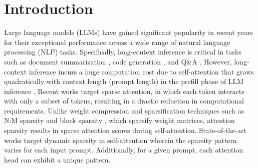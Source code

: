 \documentclass[conference]{IEEEtran}
\begin{document}
%
\IEEEpeerreviewmaketitle
\section{Introduction}
Large language models (LLMs) have gained significant popularity in recent years for their exceptional performance across a wide range of natural language processing (NLP) tasks. Specifically, long-context inference is critical in tasks such as document summarization \cite{liao2025e2llm, bai2025longbench}, code generation \cite{huynh2025large, yang2025empirical}, and Q\&A \cite{yan2025mir,xiao2025generalizing}. However, long-context inference incurs a huge computation cost due to self-attention that grows quadratically with context length (prompt length) in the prefill phase of LLM inference \cite{vaswani2017attention}. Recent works \cite{NEURIPS2020_c8512d14, NEURIPS2024_5dfbe6f5, xiao2024efficient,hao2025omnikv,flexprefill} target sparse attention, in which each token interacts with only a subset of tokens, resulting in a drastic reduction in computational requirements. Unlike weight compression and sparsification techniques such as N:M sparsity \cite{NEURIPS2021_6e8404c3} and block sparsity \cite{9424344}, which sparsify weight matrices, attention sparsity results in sparse attention scores during self-attention. State-of-the-art works \cite{flexprefill,NEURIPS2024_5dfbe6f5} target dynamic sparsity in self-attention wherein the sparsity pattern varies for each input prompt. Additionally, for a given prompt, each attention head can exhibit a unique pattern.
\end{document}
